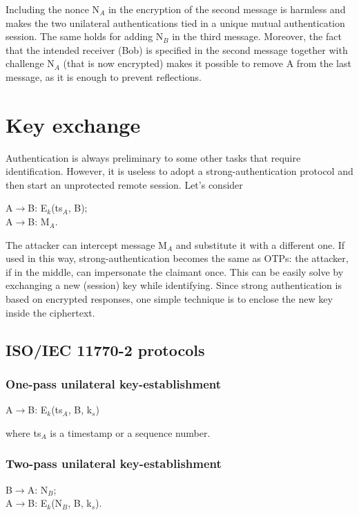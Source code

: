 \documentclass[a4paper, 12pt]{report}
\begin{document}
Including the nonce N$_A$ in the encryption of the second message is harmless and makes the two unilateral authentications tied in a unique mutual authentication session. The same holds for adding N$_B$ in the third message. Moreover, the fact that the intended receiver (Bob) is specified in the second message together with challenge N$_A$ (that is now encrypted) makes it possible to remove A from the last message, as it is enough to prevent reflections.

\section*{Key exchange}
Authentication is always preliminary to some other tasks that require identification. However, it is useless to adopt a strong-authentication protocol and then start an unprotected remote session. Let's consider
\begin{center}
	A$\rightarrow$B: E$_k$(ts$_A$, B);\\
	A$\rightarrow$B: M$_A$.
\end{center}
The attacker can intercept message M$_A$ and substitute it with a different one. If used in this way, strong-authentication becomes the same as OTPs: the attacker, if in the middle, can impersonate the claimant once. This can be easily solve by exchanging a new (session) key while identifying. Since strong authentication is based on encrypted responses, one simple technique is to enclose the new key inside the ciphertext.

\subsection*{ISO/IEC 11770-2 protocols}
\subsubsection{One-pass unilateral key-establishment}
\begin{center}
	A$\rightarrow$B: E$_k$(ts$_A$, B, k$_s$)
\end{center} 
where ts$_A$ is a timestamp or a sequence number.

\subsubsection{Two-pass unilateral key-establishment}
\begin{center}
	B$\rightarrow$A: N$_B$;\\
	A$\rightarrow$B: E$_k$(N$_B$, B, k$_s$).
\end{center}
\end{document}
